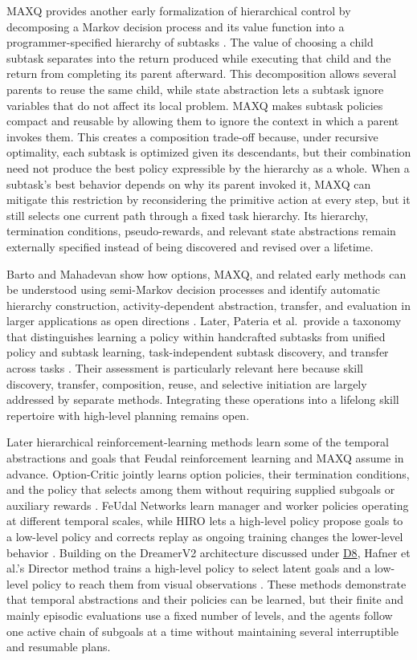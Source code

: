 \documentclass[10pt,journal,compsoc]{IEEEtran}
\DeclareRobustCommand{\Dref}[1]{\hyperref[sec:d#1]{D#1}}
\begin{document}
MAXQ provides another early formalization of hierarchical control by decomposing a Markov decision process and its value function into a programmer-specified hierarchy of subtasks \cite{dietterich2000}.
The value of choosing a child subtask separates into the return produced while executing that child and the return from completing its parent afterward.
This decomposition allows several parents to reuse the same child, while state abstraction lets a subtask ignore variables that do not affect its local problem.
MAXQ makes subtask policies compact and reusable by allowing them to ignore the context in which a parent invokes them.
This creates a composition trade-off because, under recursive optimality, each subtask is optimized given its descendants, but their combination need not produce the best policy expressible by the hierarchy as a whole.
When a subtask's best behavior depends on why its parent invoked it, MAXQ can mitigate this restriction by reconsidering the primitive action at every step, but it still selects one current path through a fixed task hierarchy.
Its hierarchy, termination conditions, pseudo-rewards, and relevant state abstractions remain externally specified instead of being discovered and revised over a lifetime.

Barto and Mahadevan show how options, MAXQ, and related early methods can be understood using semi-Markov decision processes and identify automatic hierarchy construction, activity-dependent abstraction, transfer, and evaluation in larger applications as open directions \cite{barto2003}.
Later, Pateria et al.\ provide a taxonomy that distinguishes learning a policy within handcrafted subtasks from unified policy and subtask learning, task-independent subtask discovery, and transfer across tasks \cite{pateria2021}.
Their assessment is particularly relevant here because skill discovery, transfer, composition, reuse, and selective initiation are largely addressed by separate methods.
Integrating these operations into a lifelong skill repertoire with high-level planning remains open.

Later hierarchical reinforcement-learning methods learn some of the temporal abstractions and goals that Feudal reinforcement learning and MAXQ assume in advance.
Option-Critic jointly learns option policies, their termination conditions, and the policy that selects among them without requiring supplied subgoals or auxiliary rewards \cite{bacon2017}.
FeUdal Networks learn manager and worker policies operating at different temporal scales, while HIRO lets a high-level policy propose goals to a low-level policy and corrects replay as ongoing training changes the lower-level behavior \cite{vezhnevets2017,nachum2018}.
Building on the DreamerV2 architecture discussed under \Dref{8}, Hafner et al.'s Director method trains a high-level policy to select latent goals and a low-level policy to reach them from visual observations \cite{hafner2021,hafner2022}.
These methods demonstrate that temporal abstractions and their policies can be learned, but their finite and mainly episodic evaluations use a fixed number of levels, and the agents follow one active chain of subgoals at a time without maintaining several interruptible and resumable plans.
\end{document}
